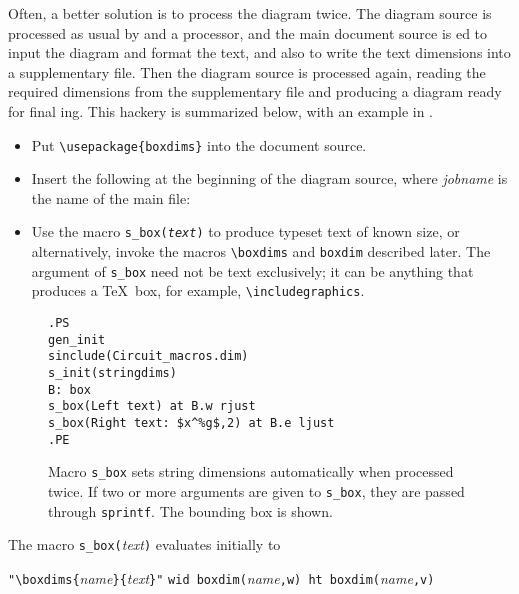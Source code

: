 Often, a better solution is to process the diagram twice.  The
diagram source is processed as usual by \Mfour and a \pic processor, and the
main document source is \latex{}ed to input the diagram and format the
text, and also to write the text dimensions into a supplementary file.
Then the diagram source is processed again, reading the required
dimensions from the supplementary file and producing a diagram ready
for final \latex{}ing.
This hackery is summarized below, with an example in .
\begin{itemize}
\item Put \verb|\usepackage{boxdims}| into the document source.
\item Insert the following at the beginning of the diagram source,
 where {\sl jobname} is the name of the main \latex file:\hfill\break
\item Use the macro {\tt s\_box({\sl text})} to produce
 typeset text of known size, or alternatively, invoke the macros
 \verb|\boxdims| and \verb|boxdim| described later.
 The argument of {\tt s\_box} need not be text exclusively; it can
 be anything that produces a \TeX\ box, for example, \verb|\includegraphics|.
\end{itemize}
\begin{figure}[H]
   \parbox{3.5in}{\small\tt.PS\\
     gen\_init\\
     sinclude(Circuit\_macros.dim)\\
     s\_init(stringdims)\\
     B: box\\
       \hbox{}\quad s\_box(Left text) at B.w rjust\\
       \hbox{}\quad s\_box(Right text: \$x\^{}{\%g}\$,2) at B.e ljust\\
     .PE}%
   \hfill\llap{\raise-0.25in\hbox{ }}%
   \caption{Macro {\tt s\_box} sets string dimensions automatically
    when processed twice.  If two or more arguments are
    given to {\tt s\_box}, they
    are passed through {\tt sprintf}.  The bounding box is shown.}
   \label{stringdim}
   \end{figure}

\noindent The macro \verb|s_box(|{\sl text}\verb|)| evaluates initially to

 \verb|"\boxdims{|{\sl name}\verb|}{|{\sl text}\verb|}"|
  \verb|wid boxdim(|{\sl name}\verb|,w) ht boxdim(|{\sl name}\verb|,v)|

